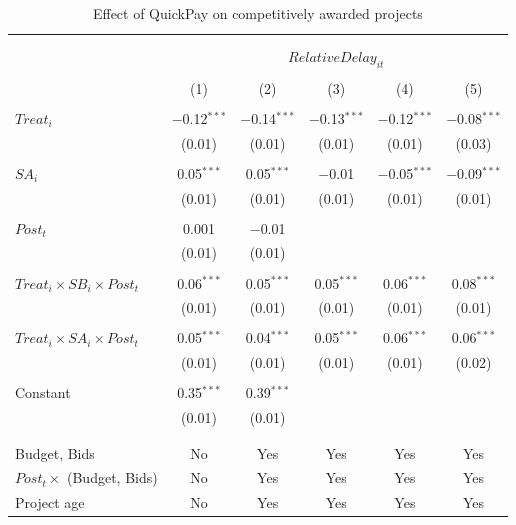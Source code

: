 \documentclass[]{article}
\begin{document}
\begin{table}[H] \centering 
  \caption{Effect of QuickPay on competitively awarded projects} 
  \label{} 
\small 
\begin{tabular}{@{\extracolsep{-2pt}}lccccc} 
\\[-1.8ex]\hline 
\hline \\[-1.8ex] 
\\[-1.8ex] & \multicolumn{5}{c}{$RelativeDelay_{it}$  } \\ 
\\[-1.8ex] & (1) & (2) & (3) & (4) & (5)\\ 
\hline \\[-1.8ex] 
 $Treat_i$ & $-$0.12$^{***}$ & $-$0.14$^{***}$ & $-$0.13$^{***}$ & $-$0.12$^{***}$ & $-$0.08$^{***}$ \\ 
  & (0.01) & (0.01) & (0.01) & (0.01) & (0.03) \\ 
  & & & & & \\ 
 $SA_i$ & 0.05$^{***}$ & 0.05$^{***}$ & $-$0.01 & $-$0.05$^{***}$ & $-$0.09$^{***}$ \\ 
  & (0.01) & (0.01) & (0.01) & (0.01) & (0.01) \\ 
  & & & & & \\ 
 $Post_t$ & 0.001 & $-$0.01 &  &  &  \\ 
  & (0.01) & (0.01) &  &  &  \\ 
  & & & & & \\ 
 $Treat_i \times SB_i \times Post_t$ & 0.06$^{***}$ & 0.05$^{***}$ & 0.05$^{***}$ & 0.06$^{***}$ & 0.08$^{***}$ \\ 
  & (0.01) & (0.01) & (0.01) & (0.01) & (0.01) \\ 
  & & & & & \\ 
 $Treat_i \times SA_i \times Post_t$ & 0.05$^{***}$ & 0.04$^{***}$ & 0.05$^{***}$ & 0.06$^{***}$ & 0.06$^{***}$ \\ 
  & (0.01) & (0.01) & (0.01) & (0.01) & (0.02) \\ 
  & & & & & \\ 
 Constant & 0.35$^{***}$ & 0.39$^{***}$ &  &  &  \\ 
  & (0.01) & (0.01) &  &  &  \\ 
  & & & & & \\ 
\hline \\[-1.8ex] 
Budget, Bids & No & Yes & Yes & Yes & Yes \\ 
$Post_t \times $  (Budget, Bids) & No & Yes & Yes & Yes & Yes \\ 
Project age & No & Yes & Yes & Yes & Yes \\ 

\end{tabular}
\end{table}
\end{document}
